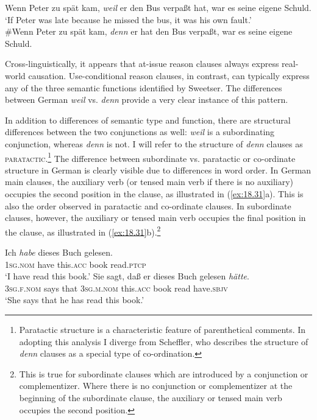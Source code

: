 \ea \label{ex:18.37}
\ea  Wenn Peter zu spät kam, \textit{weil} er den Bus verpaßt hat, war es seine eigene Schuld.\\
\glt ‘If Peter was late because he missed the bus, it was his own fault.’ \\
\ex \#Wenn Peter zu spät kam, \textit{denn} er hat den Bus verpaßt, war es seine eigene Schuld.
\z \z


Cross-linguistically, it appears that at-issue reason clauses always express real-world causation. Use-conditional reason clauses, in contrast, can typically express any of the three semantic functions identified by Sweetser. The differences between German \textit{weil} vs. \textit{denn} provide a very clear instance of this pattern.


In addition to differences of semantic type and function, there are structural differences between the two conjunctions as well: \textit{weil} is a subordinating conjunction, whereas \textit{denn} is not. I will refer to the structure of \textit{denn} clauses as \textsc{paratactic}.\footnote{Paratactic structure is a characteristic feature of parenthetical comments. In adopting this analysis I diverge from Scheffler, who describes the structure of \textit{denn} clauses as a special type of co-ordination.} The difference between subordinate vs. paratactic or co-ordinate structure in German is clearly visible due to differences in word order. In German main clauses, the auxiliary verb (or tensed main verb if there is no auxiliary) occupies the second position in the clause, as illustrated in (\ref{ex:18.31}a). This is also the order observed in paratactic and co-ordinate clauses. In subordinate clauses, however, the auxiliary or tensed main verb occupies the final position in the clause, as illustrated in (\ref{ex:18.31}b).\footnote{This is true for subordinate clauses which are introduced by a conjunction or complementizer. Where there is no conjunction or complementizer at the beginning of the subordinate clause, the auxiliary or tensed main verb occupies the second position.}


\ea \label{ex:18.31}
\ea   \gll Ich  \textit{habe}  dieses  Buch  gelesen.\\
\textsc{1sg}.\textsc{nom}  have  this.\textsc{acc}  book  read.\textsc{ptcp}\\
\glt ‘I have read this book.’
\ex \gll Sie  sagt,  daß  er  dieses  Buch  gelesen  \textit{hätte}.\\
\textsc{3sg}.\textsc{f}.\textsc{nom}  says  that  \textsc{3sg}.\textsc{m}.\textsc{nom}  this.\textsc{acc}  book  read  have.\textsc{sbjv}\\
\glt ‘She says that he has read this book.’
\z \z


